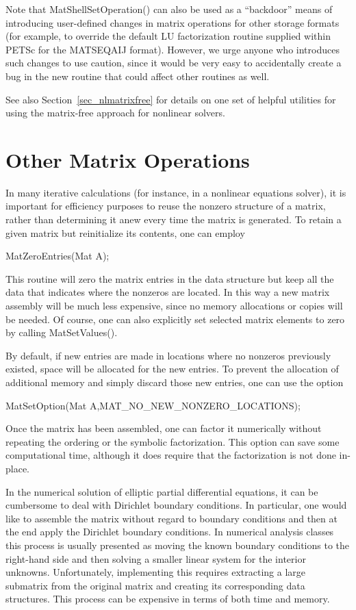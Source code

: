Note that MatShellSetOperation() can also be used as a
``backdoor'' means of introducing user-defined changes in matrix
operations for other storage formats (for example, to override the
default LU factorization routine supplied within PETSc for the
MATSEQAIJ format).  However, we urge anyone who introduces such
changes to use caution, since it would be very easy to
accidentally create a bug in the new routine that could affect
other routines as well.

See also Section~\ref{sec_nlmatrixfree} for details on one set of
helpful utilities for using the matrix-free approach for nonlinear
solvers.

\section{Other Matrix Operations}
\label{sec_othermat}

In many iterative calculations (for instance, in a nonlinear equations
solver), it is important for efficiency purposes to reuse the nonzero 
structure of a matrix, rather than determining it anew every time 
the matrix is generated.  To retain a given matrix but reinitialize
its contents, one can employ 
\begin{tabbing}
  MatZeroEntries(Mat A);
\end{tabbing}
This routine will zero the matrix entries in the 
data structure but keep all the data that indicates where the nonzeros
are located.  In this way a new matrix assembly will be much less 
expensive, since no memory allocations or copies will be needed. 
Of course, one can also explicitly set selected matrix elements to zero
by calling MatSetValues().

By default, if new entries are made in locations where no nonzeros 
previously existed, space will be allocated for the new entries. 
To prevent the allocation of additional memory and simply discard those 
new entries, one can use the option 
\begin{tabbing}
  MatSetOption(Mat A,MAT\_NO\_NEW\_NONZERO\_LOCATIONS);
\end{tabbing}
Once the matrix has been assembled, one can factor it numerically
without repeating the ordering or the symbolic factorization. 
This option can save some computational time, although it
does require that the factorization is not done in-place.

In the numerical solution of elliptic partial differential equations,
it can be cumbersome to deal with Dirichlet boundary 
 conditions. In
particular, one would like to assemble the matrix without regard to 
boundary conditions and then at the end apply the Dirichlet boundary 
conditions. 
In numerical analysis classes this process is usually presented as moving the 
known boundary conditions to the right-hand side and then solving a smaller
linear system for the interior unknowns. Unfortunately, implementing this
requires extracting a large submatrix from the original matrix and 
creating its corresponding data structures. This process can be expensive 
in terms of both time and memory. 

